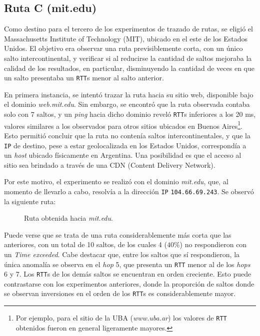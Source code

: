 \subsection{Ruta C (mit.edu)}

Como destino para el tercero de los experimentos de trazado de rutas, se
eligió el Massachusetts Institute of Technology (MIT), ubicado en el este de
los Estados Unidos. El objetivo era observar una ruta previsiblemente corta,
con un único salto intercontinental, y verificar si al reducirse la cantidad
de saltos mejoraba la calidad de los resultados, en particular, disminuyendo
la cantidad de veces en que un salto presentaba un \texttt{RTT}s menor al
salto anterior.

En primera instancia, se intentó trazar la ruta hacia su
sitio web, disponible bajo el dominio \emph{web.mit.edu}. Sin embargo, se
encontró que la ruta observada contaba solo con 7 saltos, y un \emph{ping}
hacia dicho dominio reveló \texttt{RTT}s inferiores a los 20 ms, valores
similares a los observados para otros sitios ubicados en Buenos
Aires\footnote{Por ejemplo, para el sitio de la UBA (\emph{www.uba.ar}) los
valores de \texttt{RTT} obtenidos fueron en general ligeramente mayores.}.
Esto permitió concluir que la ruta no contenía saltos intercontinentales, y
que la \texttt{IP} de destino, pese a estar geolocalizada en los Estados
Unidos, correspondía a un \emph{host} ubicado físicamente en Argentina. Una
posibilidad es que el acceso al sitio sea brindado a través de una CDN
(Content Delivery Network).

Por este motivo, el experimento se realizó con el dominio \emph{mit.edu}, que,
al momento de llevarlo a cabo, resolvía a la dirección \texttt{IP}
\texttt{104.66.69.243}. Se observó la siguiente ruta:

\begin{figure}[H]
    \caption{Ruta obtenida hacia \emph{mit.edu}.}
    \label{res:escC:table}
\end{figure}

Puede verse que se trata de una ruta considerablemente más corta que las
anteriores, con un total de 10 saltos, de los cuales 4 ($40\%$) no
respondieron con un \emph{Time exceeded}. Cabe destacar que, entre los saltos
que sí respondieron, la única anomalía se observa en el \emph{hop} 5, que
presenta un \texttt{RTT} menor al de los \emph{hops} 6 y 7. Los \texttt{RTT}s
de los demás saltos se encuentran en orden creciente. Esto puede contrastarse
con los experimentos anteriores, donde la proporción de saltos donde se
observan inversiones en el orden de los \texttt{RTT}s es considerablemente
mayor.

